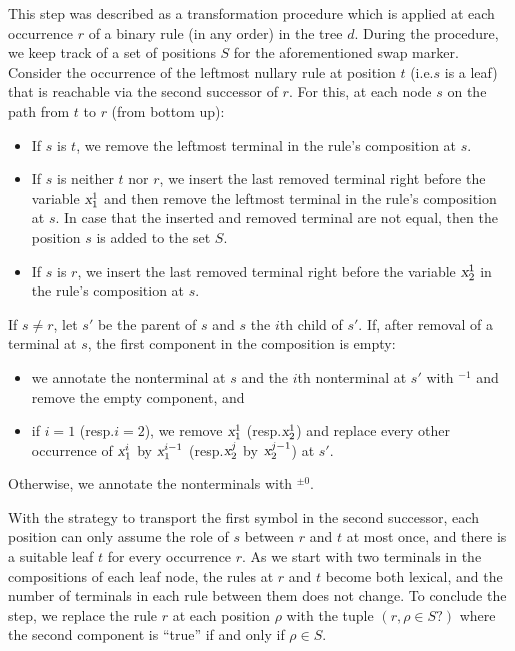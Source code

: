 \documentclass[../../document.tex]{subfiles}
\begin{document}
    This step was described as a transformation procedure which is applied at each occurrence \(r\) of a binary rule (in any order) in the tree \(d\).
    During the procedure, we keep track of a set of positions \(S\) for the aforementioned swap marker.
    Consider the occurrence of the leftmost nullary rule at position \(t\) (i.e.\@ \(s\) is a leaf) that is reachable via the second successor of \(r\).
    For this, at each node \(s\) on the path from \(t\) to \(r\) (from bottom up):
    \begin{itemize}[nosep]
        \item If \(s\) is \(t\), we remove the leftmost terminal in the rule's composition at \(s\).
        \item
            If \(s\) is neither \(t\) nor \(r\), we insert the last removed terminal right before the variable \(\textsl{x}^1_1\) and then remove the leftmost terminal in the rule's composition at \(s\).
            In case that the inserted and removed terminal are not equal, then the position \(s\) is added to the set \(S\).
        \item If \(s\) is \(r\), we insert the last removed terminal right before the variable \(\textsl{x}^1_2\) in the rule's composition at \(s\).
    \end{itemize}
    If \(s \neq r\), let \(s'\) be the parent of $s$ and $s$ the \(i\)th child of $s'$.
    If, after removal of a terminal at \(s\), the first component in the composition is empty:
    \begin{itemize}[noitemsep,topsep=1pt]
        \item we annotate the  nonterminal at \(s\) and the \(i\)th  nonterminal at \(s'\) with $^{-1}$ and remove the empty component, and
        \item if \(i = 1\) (resp.\@ \(i = 2\)), we remove \(\textsl{x}^1_1\) (resp.\@ \(\textsl{x}_2^1\)) and replace every other occurrence of \(\textsl{x}_1^i\) by \(\textsl{x}_1^{i-1}\) (resp.\@ \(\textsl{x}_2^j\) by \(\textsl{x}_2^{j-1}\)) at $s'$.
    \end{itemize}
    Otherwise, we annotate the nonterminals with \(^{\pm 0}\).

    With the strategy to transport the first symbol in the second successor, each position can only assume the role of \(s\) between \(r\) and \(t\) at most once, and there is a suitable leaf $t$ for every occurrence $r$.
    As we start with two terminals in the compositions of each leaf node, the rules at \(r\) and \(t\) become both lexical, and the number of terminals in each rule between them does not change.
    To conclude the step, we replace the rule \(r\) at each position \(\rho\) with the tuple \((r, \rho \in S?)\) where the second component is ``true'' if and only if \(\rho \in S\).
\end{document}
